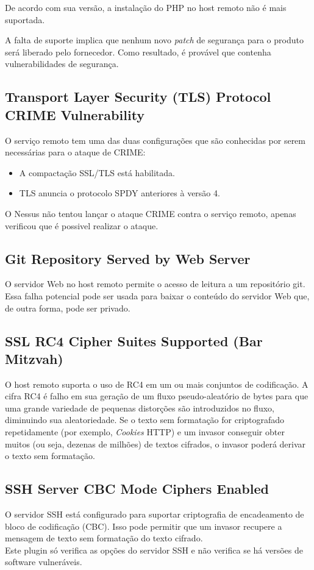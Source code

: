 \documentclass[
	12pt,				%
	openright,			%
	twoside,			%
	a4paper,			%
	english,			%
	french,				%
	spanish,			%
	brazil				%
	]{abntex2}
\begin{document}
De acordo com sua versão, a instalação do PHP no host remoto não é mais suportada.

A falta de suporte implica que nenhum novo \textit{patch} de segurança para o produto será liberado pelo fornecedor. Como resultado, é provável que contenha vulnerabilidades de segurança.

\subsection{Transport Layer Security (TLS) Protocol CRIME Vulnerability}

O serviço remoto tem uma das duas configurações que são conhecidas por serem necessárias para o ataque de CRIME:
\begin{itemize}
	\item A compactação SSL/TLS está habilitada.
	\item TLS anuncia o protocolo SPDY anteriores à versão 4.
\end{itemize}
O Nessus não tentou lançar o ataque CRIME contra o serviço remoto, apenas verificou que é possivel realizar o ataque.

\subsection{Git Repository Served by Web Server}
 O servidor Web no host remoto permite o acesso de leitura a um repositório git.  Essa falha potencial pode ser usada para baixar o conteúdo do servidor Web que, de outra forma, pode ser privado.

\subsection{SSL RC4 Cipher Suites Supported (Bar Mitzvah)}

O host remoto suporta o uso de RC4 em um ou mais conjuntos de codificação. A cifra RC4 é falho em sua geração de um fluxo pseudo-aleatório de bytes para que uma grande variedade de pequenas distorções são introduzidos no fluxo, diminuindo sua aleatoriedade.
Se o texto sem formatação for criptografado repetidamente (por exemplo, \textit{Cookies} HTTP) e um invasor conseguir obter muitos (ou seja, dezenas de milhões) de textos cifrados, o invasor poderá derivar o texto sem formatação.

\subsection{SSH Server CBC Mode Ciphers Enabled}
 O servidor SSH está configurado para suportar criptografia de encadeamento de bloco de codificação (CBC).  Isso pode permitir que um invasor recupere a mensagem de texto sem formatação do texto cifrado. 
\\
Este plugin só verifica as opções do servidor SSH e não verifica se há versões de software vulneráveis.
\end{document}
